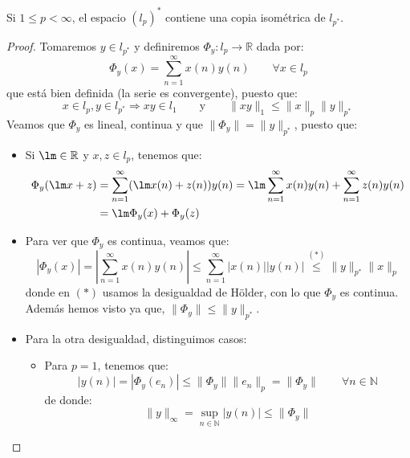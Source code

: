 \begin{prop}
    Si $1\leq p < \infty$, el espacio ${(l_p)}^{\ast}$ contiene una copia isométrica de $l_{p^\ast}$.
    \begin{proof}
    Tomaremos $y\in l_{p^\ast}$ y definiremos $\Phi_y:l_p\to \mathbb{R}$ dada por:
    \begin{equation*}
        \Phi_y(x) = \sum_{n=1}^{\infty}x(n)y(n) \qquad \forall x\in l_p
    \end{equation*}
    que está bien definida (la serie es convergente), puesto que:
    \begin{equation*}
        x\in l_p, y\in l_{p^\ast} \Longrightarrow xy \in l_1 \qquad \text{y}\qquad \|xy\|_1 \leq \|x\|_p \|y\|_{p^\ast}
    \end{equation*}
    Veamos que $\Phi_y$ es lineal, continua y que $\|\Phi_y\| = \|y\|_{p^\ast}$, puesto que:
    \begin{itemize}
        \item Si $\lm\in \mathbb{R}$ y $x,z\in l_p$, tenemos que:
            \begin{align*}
                \Phi_y(\lm x + z) &= \sum_{n=1}^{\infty} (\lm x(n) + z(n))y(n) = \lm \sum_{n=1}^{\infty}x(n)y(n) + \sum_{n=1}^{\infty}z(n)y(n) \\ &= \lm\Phi_y(x) + \Phi_y(z)
            \end{align*}
        \item Para ver que $\Phi_y$ es continua, veamos que:
            \begin{equation*}
                |\Phi_y(x)| = \left|\sum_{n=1}^{\infty}x(n)y(n)\right| \leq \sum_{n=1}^{\infty}|x(n)||y(n)| \stackrel{(\ast)}{\leq} \|y\|_{p^\ast}\|x\|_p
            \end{equation*}
            donde en $(\ast)$ usamos la desigualdad de Hölder, con lo que $\Phi_y$ es continua. Además hemos visto ya que, $\|\Phi_y\| \leq \|y\|_{p^\ast}$.
        \item Para la otra desigualdad, distinguimos casos:
            \begin{itemize}
                \item Para $p=1$, tenemos que:
                    \begin{equation*}
                        |y(n)| = |\Phi_y(e_n)| \leq \|\Phi_y\| \|e_n\|_p = \|\Phi_y\| \qquad \forall n\in \mathbb{N}
                    \end{equation*}
                    de donde:
                    \begin{equation*}
                        \|y\|_\infty = \sup_{n\in \mathbb{N}}|y(n)| \leq \|\Phi_y\|

\end{equation*}
\end{itemize}
\end{itemize}
\end{proof}
\end{prop}
